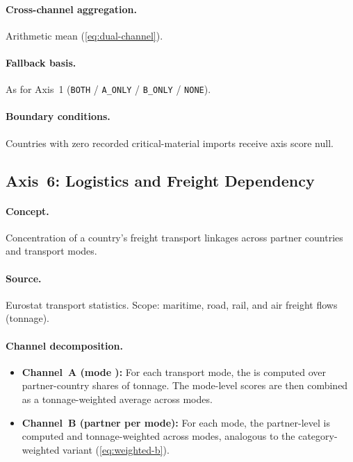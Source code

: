 \paragraph{Cross-channel aggregation.}
Arithmetic mean (\cref{eq:dual-channel}).

\paragraph{Fallback basis.}
As for Axis~1 (\texttt{BOTH} / \texttt{A\_ONLY} / \texttt{B\_ONLY} /
\texttt{NONE}).

\paragraph{Boundary conditions.}
Countries with zero recorded critical-material imports receive axis
score null.

\subsection{Axis~6: Logistics and Freight Dependency}%
\label{sec:axis:logistics}

\paragraph{Concept.}
Concentration of a country's freight transport linkages across partner
countries and transport modes.

\paragraph{Source.}
Eurostat transport statistics.  Scope: maritime, road, rail, and air
freight flows (tonnage).

\paragraph{Channel decomposition.}
\begin{itemize}
  \item \textbf{Channel~A (mode \HHI):}  For each transport mode, the \HHI
    is computed over partner-country shares of tonnage.  The mode-level
    scores are then combined as a tonnage-weighted average across modes.
  \item \textbf{Channel~B (partner \HHI per mode):}  For each mode, the
    partner-level \HHI is computed and tonnage-weighted across modes,
    analogous to the category-weighted variant (\cref{eq:weighted-b}).
\end{itemize}

